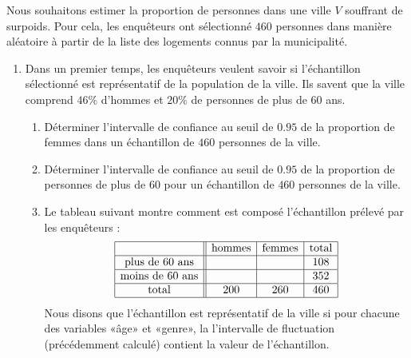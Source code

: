 
\begin{exercice}\label{exosmath-0349}

    Nous souhaitons estimer la proportion de personnes dans une ville \( V\) souffrant de surpoids. Pour cela, les enquêteurs ont sélectionné \( 460\) personnes dans manière aléatoire à partir de la liste des logements connus par la municipalité.
    \begin{enumerate}
        \item
            Dans un premier temps, les enquêteurs veulent savoir si l'échantillon sélectionné est représentatif de la population de la ville. Ils savent que la ville comprend \( 46\%\) d'hommes et \( 20\%\) de personnes de plus de \( 60\) ans.
            \begin{enumerate}
                \item
                    Déterminer l'intervalle de confiance au seuil de \( 0.95\) de la proportion de femmes dans un échantillon de \( 460\) personnes de la ville.
                \item
                    Déterminer l'intervalle de confiance au seuil de \( 0.95\) de la proportion de personnes de plus de \( 60\) pour un échantillon de \( 460\) personnes de la ville.
                \item
                    Le tableau suivant montre comment est composé l'échantillon prélevé par les enquêteurs :
                    \begin{equation*}
                        \begin{array}[]{|c||c|c|c|}
                            \hline
                            &\text{hommes}&\text{femmes}&\text{total}\\
                            \hline
                            \text{plus de \( 60\) ans}&&&108\\
                            \hline
                            \text{moins de \( 60\) ans}&&&352\\
                            \hline
                            \text{total}&200&260&460\\
                            \hline
                        \end{array}
                    \end{equation*}
                    Nous disons que l'échantillon est représentatif de la ville si pour chacune des variables «âge» et «genre», la l'intervalle de fluctuation (précédemment calculé) contient la valeur de l'échantillon.


\end{enumerate}
\end{enumerate}
\end{exercice}
